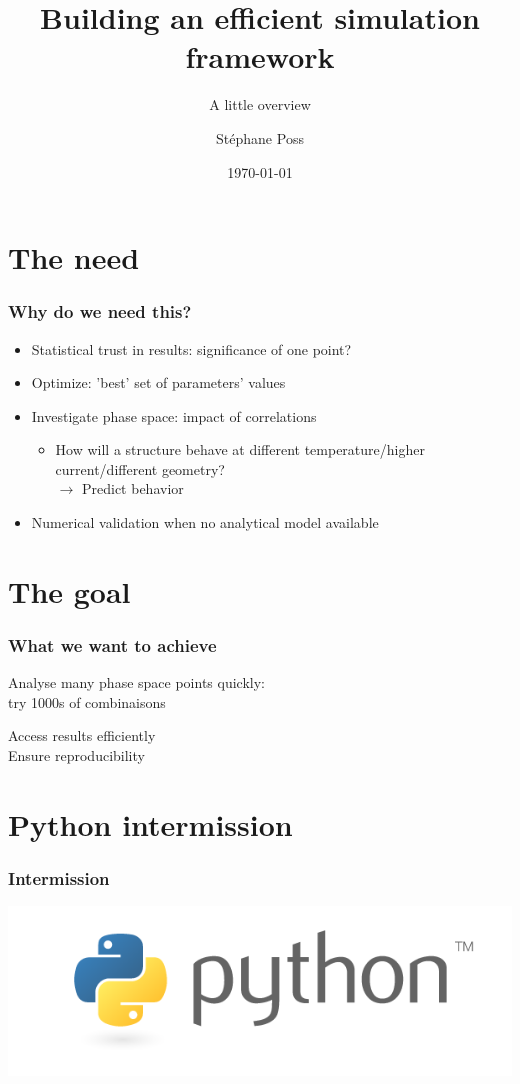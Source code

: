 \documentclass[14pt]{beamer}
\title{Building an efficient simulation framework}
\subtitle{A little overview}
\author{St\'ephane Poss}
\date{\today}
\begin{document}
\begin{frame}[plain]
\titlepage
\end{frame}

\begin{frame}
\tableofcontents
\end{frame}

\section{The need}
\begin{frame}
\frametitle{Why do we need this?}
\begin{itemize}
\item Statistical trust in results: significance of one point?
\pause
\item Optimize: 'best' set of parameters' values
\pause
\item Investigate phase space: impact of correlations
\begin{itemize}
\item How will a structure behave at different temperature/higher current/different geometry?\\ 
\pause
\alert{$\rightarrow$ Predict behavior}
\end{itemize}
\pause
\item Numerical validation when no analytical model available
\end{itemize}
\end{frame}

\section{The goal}
\begin{frame}
\frametitle{What we want to achieve}
\begin{block}{}
Analyse many phase space points quickly: \\try 1000s of combinaisons
\end{block}
\begin{block}{}
Access results efficiently\\
Ensure reproducibility
\end{block}
\end{frame}

\section{Python intermission}
\begin{frame}
\frametitle{Intermission}
\centering
\includegraphics[width=\textwidth]{python-logo-master-v3-TM.png}
\end{frame}
\end{document}
